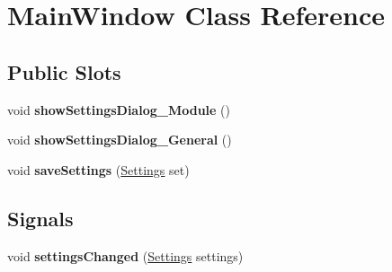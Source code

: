 \hypertarget{classMainWindow}{
\section{MainWindow Class Reference}
\label{classMainWindow}
}
\subsection*{Public Slots}
\begin{DoxyCompactItemize}
\item 
\hypertarget{classMainWindow_ac4d16cb0945152f7be27dcac8f85703d}{
void {\bfseries showSettingsDialog\_\-Module} ()}
\label{classMainWindow_ac4d16cb0945152f7be27dcac8f85703d}

\item 
\hypertarget{classMainWindow_a1c14a341d9d6b8c3b76d7c4a838463d8}{
void {\bfseries showSettingsDialog\_\-General} ()}
\label{classMainWindow_a1c14a341d9d6b8c3b76d7c4a838463d8}

\item 
\hypertarget{classMainWindow_adcb5fb16f13d14efcf2d8c37cb44d732}{
void {\bfseries saveSettings} (\hyperlink{classSettings}{Settings} set)}
\label{classMainWindow_adcb5fb16f13d14efcf2d8c37cb44d732}

\end{DoxyCompactItemize}
\subsection*{Signals}
\begin{DoxyCompactItemize}
\item 
\hypertarget{classMainWindow_aa5579ecfd0f160021551ba302e122149}{
void {\bfseries settingsChanged} (\hyperlink{classSettings}{Settings} settings)}
\label{classMainWindow_aa5579ecfd0f160021551ba302e122149}

\end{DoxyCompactItemize}
